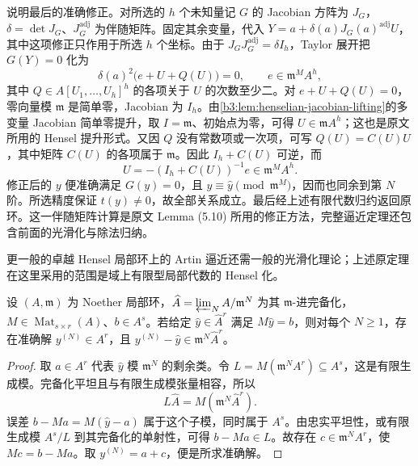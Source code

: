 \begin{proofsketch}
	说明最后的准确修正。对所选的 \(h\) 个未知量记 \(G\) 的 Jacobian 方阵为 \(J_G\)，\(\delta=\det J_G\)、\(J_G^{\mathrm{adj}}\) 为伴随矩阵。固定其余变量，代入 \(Y=a+\delta(a)J_G(a)^{\mathrm{adj}}U\)，其中这项修正只作用于所选 \(h\) 个坐标。由于 \(J_GJ_G^{\mathrm{adj}}=\delta I_h\)，Taylor 展开把 \(G(Y)=0\) 化为
	\[
		\delta(a)^2\bigl(e+U+Q(U)\bigr)=0, \qquad e\in\mathfrak m^M A^h,
	\]
	其中 \(Q\in A[U_1,\ldots,U_h]^h\) 的各项关于 \(U\) 的次数至少二。对 \(e+U+Q(U)=0\)，零向量模 \(\mathfrak m\) 是简单零，Jacobian 为 \(I_h\)。由\cref{b3:lem:henselian-jacobian-lifting}的多变量 Jacobian 简单零提升，取 \(I=\mathfrak m\)、初始点为零，可得 \(U\in\mathfrak mA^h\)；这也是原文所用的 Hensel 提升形式\cite[(1.9), pp. 25--26; Lemmas (5.10)--(5.11), pp. 47--48]{Artin1969AlgebraicApproximation}。又因 \(Q\) 没有常数项或一次项，可写 \(Q(U)=C(U)U\)，其中矩阵 \(C(U)\) 的各项属于 \(\mathfrak m\)。因此 \(I_h+C(U)\) 可逆，而
	\[
		U=-(I_h+C(U))^{-1}e\in\mathfrak m^MA^h.
	\]
	修正后的 \(y\) 便准确满足 \(G(y)=0\)，且 \(y\equiv\widehat y\pmod{\mathfrak m^M}\)，因而也同余到第 \(N\) 阶。所选精度保证 \(t(y)\ne0\)，故全部关系成立。最后经上述有限代数归约返回原环。这一伴随矩阵计算是原文 Lemma (5.10) 所用的修正方法，完整逼近定理还包含前面的光滑化与除法归纳。
\end{proofsketch}

更一般的卓越 Hensel 局部环上的 Artin 逼近还需一般的光滑化理论；上述原定理在这里采用的范围是域上有限型局部代数的 Hensel 化。

\ProseParagraphBreak


\begin{proposition}\label{b3:prop:linear-formal-approximation}
	设 \((A,\mathfrak m)\) 为 Noether 局部环，\(\widehat A=\varprojlim_N A/\mathfrak m^N\) 为其 \(\mathfrak m\)-进完备化， \(M\in\operatorname{Mat}_{s\times r}(A)\)、\(b\in A^s\)。若给定 \(\widehat y\in\widehat A^r\) 满足 \(M\widehat y=b\)，则对每个 \(N\ge1\)，存在准确解 \(y^{(N)}\in A^r\)，且 \(y^{(N)}-\widehat y\in\mathfrak m^N\widehat A^r\)。
\end{proposition}
\begin{proof}
	取 \(a\in A^r\) 代表 \(\widehat y\) 模 \(\mathfrak m^N\) 的剩余类。令 \(L=M(\mathfrak m^NA^r)\subseteq A^s\)，这是有限生成模。完备化平坦且与有限生成模张量相容，所以
	\[
		L\widehat A=M(\mathfrak m^N\widehat A^r).
	\]
	误差 \(b-Ma=M(\widehat y-a)\) 属于这个子模，同时属于 \(A^s\)。由忠实平坦性，或有限生成模 \(A^s/L\) 到其完备化的单射性，可得 \(b-Ma\in L\)。故存在 \(c\in\mathfrak m^NA^r\)，使 \(Mc=b-Ma\)。取 \(y^{(N)}=a+c\)，便是所求准确解。
\end{proof}

